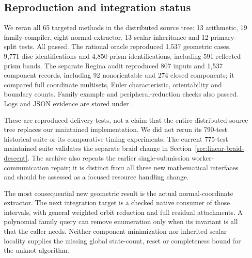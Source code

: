\subsection{Reproduction and integration status}

We reran all 65 targeted methods in the distributed source tree: 13 arithmetic,
19 family-compiler, eight normal-extractor, 13 scalar-inheritance and 12
primary-split tests. All passed. The rational oracle reproduced 1,537
geometric cases, 9,771 disc identifications and 4,850 prism identifications,
including 591 reflected prism bands. The separate Regina audit reproduced
807 inputs and 1,537 component records, including 92 nonorientable and 274
closed components; it compared full coordinate multisets, Euler characteristic,
orientability and boundary counts. Family example and peripheral-reduction
checks also passed. Logs and JSON evidence are stored under
.

These are reproduced delivery tests, not a claim that the entire distributed
source tree replaces our maintained implementation. We did not rerun its
790-test historical suite or its comparative timing experiments. The current
775-test maintained suite validates the separate braid change in
Section~\ref{sec:linear-braid-descent}. The archive also repeats the earlier
single-submission worker-communication repair; it is distinct from all three
new mathematical interfaces and should be assessed as a focused resource
handling change.

The most consequential new geometric result is the actual normal-coordinate
extractor. The next integration target is a checked native consumer of those
intervals, with general weighted orbit reduction and full residual attachments.
A polynomial family query can remove enumeration only when its invariant is
all that the caller needs. Neither component minimization nor inherited
scalar locality supplies the missing global state-count, reset or completeness
bound for the unknot algorithm.
